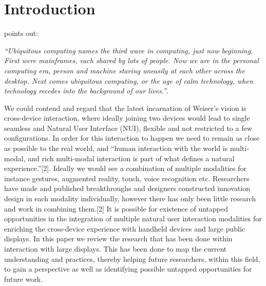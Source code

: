 \section{Introduction}
\cite{Weiser:1991} points out:
 
{\em``Ubiquitous computing names the third wave in computing, just now beginning. First were mainframes, each shared by lots of people. Now we are in the personal computing era, person and machine staring uneasily at each other across the desktop. Next comes ubiquitous computing, or the age of calm technology, when technology recedes into the background of our lives.''}.

We could contend and regard that the latest incarnation of Weiser's vision is cross-device interaction, where ideally joining two devices would lead to single seamless and Natural User Interface (NUI), flexible and not restricted to a few configurations.
In order for this interaction to happen we need to remain as close as possible to the real world, and ``human interaction with the world is multi-modal, and rich multi-modal interaction is part of what defines a natural experience.''[2]. 
Ideally we would see a combination of multiple modalities for instance gestures, augmented reality, touch, voice recognition etc. 
Researchers have made and published breakthroughs and designers constructed innovation design in each modality individually, however there has only been little research and work in combining them.[2] 
It is possible for existence of untapped opportunities in the integration of multiple natural user interaction modalities for enriching the cross-device experience with handheld devices and large public displays. 
In this paper we review the research that has been done within interaction with large displays. 
This has been done to map the current understanding and practices, thereby helping future researchers, within this field, to gain a perspective as well as identifying possible untapped opportunities for future work.